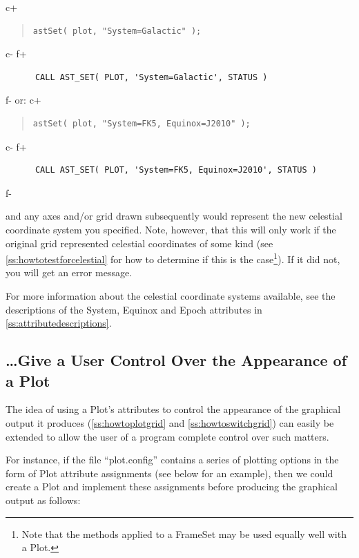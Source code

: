 \documentclass[twoside,11pt]{article}
\newcommand{\appref}[1]{Appendix~\ref{#1}}
\newcommand{\secref}[1]{\S\ref{#1}}
\renewcommand{\appref}[1]{\ref{#1}}
\renewcommand{\secref}[1]{\ref{#1}}
\begin{document}
c+
\begin{quote}
\small
\begin{verbatim}
astSet( plot, "System=Galactic" );
\end{verbatim}
\normalsize
\end{quote}
c-
f+
\small
\begin{verbatim}
      CALL AST_SET( PLOT, 'System=Galactic', STATUS )
\end{verbatim}
\normalsize
f-
or:
c+
\begin{quote}
\small
\begin{verbatim}
astSet( plot, "System=FK5, Equinox=J2010" );
\end{verbatim}
\normalsize
\end{quote}
c-
f+
\small
\begin{verbatim}
      CALL AST_SET( PLOT, 'System=FK5, Equinox=J2010', STATUS )
\end{verbatim}
\normalsize
f-

and any axes and/or grid drawn subsequently would represent the new
celestial coordinate system you specified.  Note, however, that this
will only work if the original grid represented celestial coordinates
of some kind (see \secref{ss:howtotestforcelestial} for how to
determine if this is the case\footnote{Note that the methods applied
to a FrameSet may be used equally well with a Plot.}). If it did not,
you will get an error message.

For more information about the celestial coordinate systems available,
see the descriptions of the System, Equinox and Epoch attributes in
\appref{ss:attributedescriptions}.

\subsection{\ldots Give a User Control Over the Appearance of a Plot}

The idea of using a Plot's attributes to control the appearance of the
graphical output it produces (\secref{ss:howtoplotgrid} and
\secref{ss:howtoswitchgrid}) can easily be extended to allow the user
of a program complete control over such matters.

For instance, if the file ``plot.config'' contains a series of
plotting options in the form of Plot attribute assignments (see below
for an example), then we could create a Plot and implement these
assignments before producing the graphical output as follows:
\end{document}
